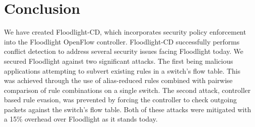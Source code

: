 \section{Conclusion}
\label{sec:conclusion}

We have created Floodlight-CD, which incorporates security policy enforcement into the Floodlight OpenFlow controller.
Floodlight-CD successfully performs conflict detection to address several security issues facing Floodlight today.
We secured Floodlight against two significant attacks.
The first being malicious applications attempting to subvert existing rules in a switch's flow table.
This was achieved through the use of alias-reduced rules combined with pairwise comparison of rule combinations on a single switch.
The second attack, controller based rule evasion, was prevented by forcing the controller to check outgoing packets against the switch's flow table.
Both of these attacks were mitigated with a 15\% overhead over Floodlight as it stands today. 

